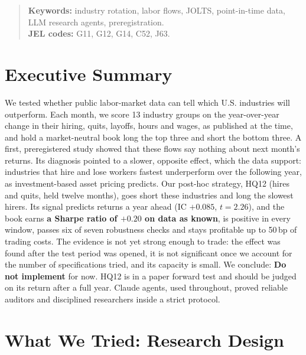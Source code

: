 \documentclass[11pt,letterpaper]{article}
\begin{document}
\begin{titlepage}
\vspace{6pt}
\begin{quote}
\small
\noindent\textbf{Keywords:} industry rotation, labor flows, JOLTS,
point-in-time data, LLM research agents, preregistration.\\[2pt]
\textbf{JEL codes:} G11, G12, G14, C52, J63.
\end{quote}
\end{titlepage}

\setcounter{page}{1}
\setcounter{footnote}{0}

\section{Executive Summary}\label{sec:summary}
We tested whether public labor-market data can tell which U.S. industries will
outperform. Each month, we score 13 industry groups on the year-over-year change
in their hiring, quits, layoffs, hours and wages, as published at the time, and
hold a market-neutral book long the top three and short the bottom three. A
first, preregistered study showed that these flows say nothing about next
month's returns. Its diagnosis pointed to a slower, opposite effect, which the
data support: industries that hire and lose workers fastest underperform over
the following year, as investment-based asset pricing predicts. Our post-hoc
strategy, HQ12 (hires and quits, held twelve months), goes short these
industries and long the slowest hirers. Its signal predicts returns a year
ahead (IC $+0.085$, $t=2.26$), and the book earns \textbf{a Sharpe ratio of $+0.20$ on
data as known}, is positive in every window, passes six of seven robustness
checks and stays profitable up to 50\,bp of trading costs. The evidence is not
yet strong enough to trade: the effect was found after the test period was
opened, it is not significant once we account for the number of specifications
tried, and its capacity is small. We conclude: \textbf{Do not implement} for
now. HQ12 is in a paper forward test and should be judged on its return after a
full year. Claude agents, used throughout, proved reliable auditors and
disciplined researchers inside a strict protocol.
\section{What We Tried: Research Design}\label{sec:try}
\end{document}

